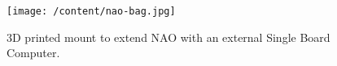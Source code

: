 \begin{figure}
	[h] \centering 
	\texttt{[image: /content/nao-bag.jpg]} \caption{3D printed mount to extend NAO with an external Single Board Computer. \cite{19} } \label{fg:nao:bag} 
\end{figure}
